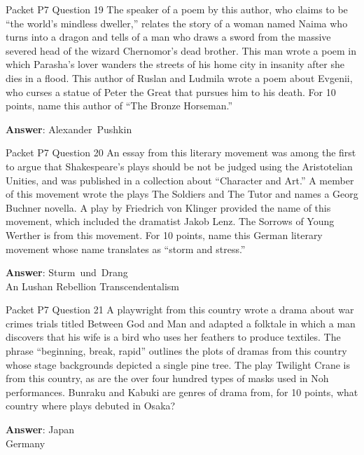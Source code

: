 \begin{frame}{Packet P7 Question 19}
The speaker of a poem by this author, who claims to be “the world's mindless dweller,” relates the story of a woman named Naima who turns into a dragon and tells of a man who draws a sword from the massive severed head of the wizard Chernomor’s dead brother. This man wrote a poem in which Parasha’s lover wanders the streets of his home city   in insanity after she dies in a flood. This author of Ruslan and Ludmila wrote     a poem about Evgenii, who curses a statue of Peter the Great   that pursues him to his death. For 10 points, name this author of “The Bronze Horseman.”

\textbf{Answer}: Alexander\ Pushkin\\
\end{frame}

\begin{frame}{Packet P7 Question 20}
An essay from this literary     movement was among the first to argue that Shakespeare’s plays should be not be judged using the Aristotelian Unities, and was published in a collection about “Character and Art.” A member of this movement wrote the plays The Soldiers and The Tutor and names a Georg Buchner novella. A play by Friedrich von Klinger provided the name   of this movement, which   included the dramatist Jakob Lenz. The Sorrows of Young Werther is from this movement. For 10 points, name this German   literary movement whose name translates as “storm and stress.”  

\textbf{Answer}: Sturm\ und\ Drang\\
 An Lushan Rebellion
 Transcendentalism
\end{frame}

\begin{frame}{Packet P7 Question 21}
A playwright from this country wrote a drama   about war crimes   trials titled Between   God and Man and adapted a folktale in which a man discovers that his wife is a   bird who uses her feathers to produce textiles. The phrase “beginning, break, rapid” outlines the plots of dramas from this country whose stage backgrounds depicted a single pine tree. The play Twilight Crane is from this country, as are the over four hundred types of masks used   in Noh performances. Bunraku and Kabuki are genres of drama from, for 10 points, what country where plays debuted in Osaka?

\textbf{Answer}: Japan\\
 Germany
\end{frame}


